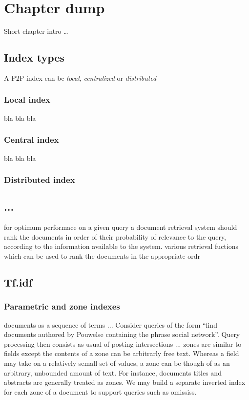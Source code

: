 \chapter{\label{cha:chapter_dump}Chapter dump}

Short chapter intro \ldots

\section{Index types}
A P2P index can be \emph{local}, \emph{centralized} or \emph{distributed}

\subsection{Local index}
bla bla bla

\subsection{Central index}
bla bla bla

\subsection{Distributed index}

\section{...}
for optimum performace on a given query a document retrieval system should rank the documents in order of their probability of relevance to the query, according to the information available to the system. various retrieval fuctions which can be used to rank the documents in the appropriate ordr



\section{Tf.idf}

\subsection{Parametric and zone indexes}
documents as a sequence of terms ... Consider queries of the form ``find documents authored by Pouwelse containing the phrase social network''. Query processing then consists as usual of posting intersections ... zones are similar to fields except the contents of a zone can be arbitrarly free text. Whereas a field may take on a relatively semall set of values, a zone can be though of as an arbitrary, unbounded amount of text. For instance, documents titles and abstracts are generally treated as zones. We may build a separate inverted index for each zone of a document to support queries such as omississ.

